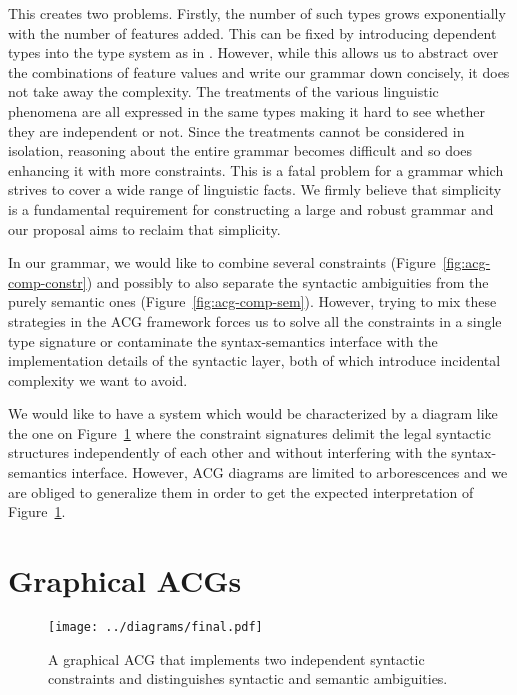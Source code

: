 \documentclass{llncs}
\begin{document}
This creates two problems. Firstly, the number of such types grows
exponentially with the number of features added. This can be fixed by
introducing dependent types into the type system as in
\cite{de2007type}. However, while this allows us to abstract over the
combinations of feature values and write our grammar down concisely, it does
not take away the complexity. The treatments of the various linguistic
phenomena are all expressed in the same types making it hard to see whether
they are independent or not. Since the treatments cannot be considered in
isolation, reasoning about the entire grammar becomes difficult and so does
enhancing it with more constraints. This is a fatal problem for a grammar
which strives to cover a wide range of linguistic facts. We firmly believe
that simplicity is a fundamental requirement for constructing a large and
robust grammar and our proposal aims to reclaim that simplicity.

In our grammar, we would like to combine several constraints
(Figure~\ref{fig:acg-comp-constr}) and possibly to also separate the syntactic
ambiguities from the purely semantic ones (Figure~\ref{fig:acg-comp-sem}).
However, trying to mix these strategies in the ACG framework forces us to
solve all the constraints in a single type signature or contaminate the
syntax-semantics interface with the implementation details of the syntactic
layer, both of which introduce incidental complexity we want to avoid.

We would like to have a system which would be characterized by a diagram like
the one on Figure~\ref{fig:gacg} where the constraint signatures delimit the
legal syntactic structures independently of each other and without interfering
with the syntax-semantics interface. However, ACG diagrams are limited to
arborescences and we are obliged to generalize them in order to get
the expected interpretation of Figure~\ref{fig:gacg}.


\section{Graphical ACGs}

\begin{figure}
  \centering
  \texttt{[image: ../diagrams/final.pdf]}
  \caption{\label{fig:gacg} A graphical ACG that implements two
      independent syntactic constraints and distinguishes syntactic and
      semantic ambiguities.}
\end{figure}
\end{document}
